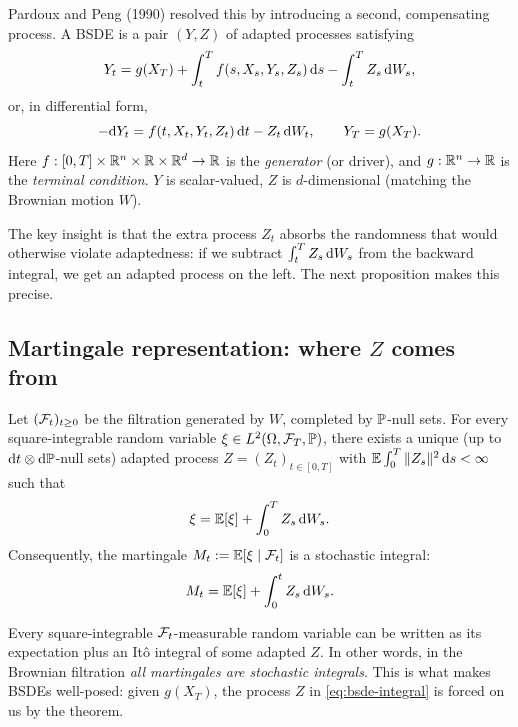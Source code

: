 Pardoux and Peng (1990) \cite{pardoux1990} resolved this by introducing a second, compensating process. A BSDE is a pair $(Y, Z)$ of adapted processes satisfying
\begin{equation}
  Y_t = g(X_T) + \int_t^T f(s, X_s, Y_s, Z_s) \, \mathrm{d} s - \int_t^T Z_s \, \mathrm{d} W_s,
  \label{eq:bsde-integral}
\end{equation}
or, in differential form,
\begin{equation}
  -\mathrm{d} Y_t = f(t, X_t, Y_t, Z_t) \, \mathrm{d} t - Z_t \, \mathrm{d} W_t, \qquad Y_T = g(X_T).
  \label{eq:bsde-differential}
\end{equation}
Here $f : [0, T] \times \mathbb{R}^n \times \mathbb{R} \times \mathbb{R}^d \to \mathbb{R}$ is the \emph{generator} (or driver), and $g : \mathbb{R}^n \to \mathbb{R}$ is the \emph{terminal condition}. $Y$ is scalar-valued, $Z$ is $d$-dimensional (matching the Brownian motion $W$).

The key insight is that the extra process $Z_t$ absorbs the randomness that would otherwise violate adaptedness: if we subtract $\int_t^T Z_s \, \mathrm{d} W_s$ from the backward integral, we get an adapted process on the left. The next proposition makes this precise.

\subsection{Martingale representation: where $Z$ comes from}

\begin{theorem}
\label{thm:martingale-rep}
Let $(\mathcal{F}_t)_{t \geq 0}$ be the filtration generated by $W$, completed by $\mathbb{P}$-null sets. For every square-integrable random variable $\xi \in L^2(\Omega, \mathcal{F}_T, \mathbb{P})$, there exists a unique (up to $\mathrm{d} t \otimes \mathrm{d} \mathbb{P}$-null sets) adapted process $Z = (Z_t)_{t \in [0, T]}$ with $\mathbb{E}\int_0^T \|Z_s\|^2 \, \mathrm{d} s < \infty$ such that
\begin{equation}
  \xi = \mathbb{E}[\xi] + \int_0^T Z_s \, \mathrm{d} W_s.
  \label{eq:mrt}
\end{equation}
Consequently, the martingale $M_t := \mathbb{E}[\xi \mid \mathcal{F}_t]$ is a stochastic integral:
\begin{equation}
  M_t = \mathbb{E}[\xi] + \int_0^t Z_s \, \mathrm{d} W_s.
\end{equation}
\end{theorem}

\begin{intuition}
Every square-integrable $\mathcal{F}_t$-measurable random variable can be written as its expectation plus an It\^o integral of some adapted $Z$. In other words, in the Brownian filtration \emph{all martingales are stochastic integrals}. This is what makes BSDEs well-posed: given $g(X_T)$, the process $Z$ in \eqref{eq:bsde-integral} is forced on us by the theorem.
\end{intuition}

